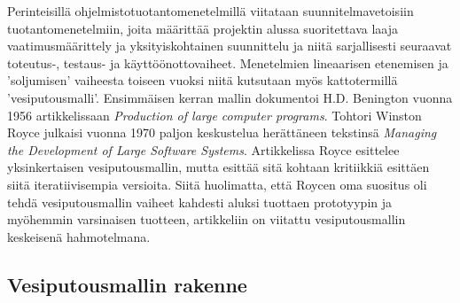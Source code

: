\documentclass[finnish,12pt]{tktltiki2}
\theoremstyle{definition}
\theoremstyle{remark}
\begin{document}
Perinteisillä ohjelmistotuotantomenetelmillä viitataan suunnitelmavetoisiin tuotantomenetelmiin, joita määrittää projektin alussa suoritettava laaja vaatimusmäärittely ja yksityiskohtainen suunnittelu ja niitä sarjallisesti seuraavat toteutus-, testaus- ja käyttöönottovaiheet. Menetelmien lineaarisen etenemisen ja 'soljumisen' vaiheesta toiseen vuoksi niitä kutsutaan myös kattotermillä 'vesiputousmalli'. Ensimmäisen kerran mallin dokumentoi H.D. Benington vuonna 1956 artikkelissaan \textit{Production of large computer programs}. \cite{Ruparelia:2010:SDL:1764810.1764814, Benington:1987:PLC:41765.41799} Tohtori Winston Royce julkaisi vuonna 1970 paljon keskustelua herättäneen tekstinsä \textit{Managing the Development of Large Software Systems}. Artikkelissa Royce esittelee yksinkertaisen vesiputousmallin, mutta esittää sitä kohtaan kritiikkiä esittäen siitä iteratiivisempia versioita. Siitä huolimatta, että Roycen oma suositus oli tehdä vesiputousmallin vaiheet kahdesti aluksi tuottaen prototyypin ja myöhemmin varsinaisen tuotteen, artikkeliin on viitattu vesiputousmallin keskeisenä hahmotelmana.

\subsection{Vesiputousmallin rakenne}
\end{document}

